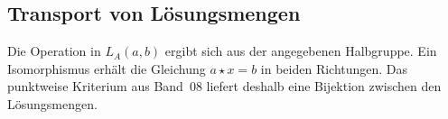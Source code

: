 \documentclass[main.tex]{subfiles}
\begin{document}
\subsection{Transport von Lösungsmengen}

\par\noindent\begin{minipage}{\linewidth}
\end{minipage}\par
Die Operation in \(L_A(a,b)\) ergibt sich aus der angegebenen
Halbgruppe. Ein Isomorphismus erhält die Gleichung \(a\star x=b\)
in beiden Richtungen. Das punktweise Kriterium aus Band~08 liefert
deshalb eine Bijektion zwischen den Lösungsmengen.
\end{document}
